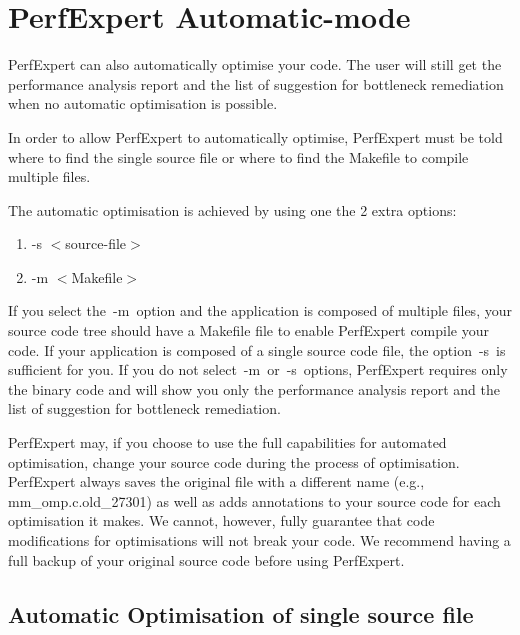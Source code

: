 \section{PerfExpert Automatic-mode}
\label{sec:PerfExpert_Automatic_Mode}


PerfExpert can also automatically optimise your code. The user will still get the performance analysis report and the list of suggestion for bottleneck remediation when no automatic optimisation is possible.

In order to allow PerfExpert to automatically optimise, PerfExpert must be told where to find the single source file or where to find the Makefile to compile multiple files.

The automatic optimisation is achieved by using one the 2 extra options:

\begin{enumerate}
  \item  -s  $<$source-file$>$
  \item  -m  $<$Makefile$>$
\end{enumerate}

If you select the~-m~option and the application is composed of multiple files, your source code tree should have a Makefile file to enable PerfExpert compile your code. If your application is composed of a single source code file, the option~-s~is sufficient for you. If you do not select~-m~or~-s~options, PerfExpert requires only the binary code and will show you only the performance analysis report and the list of suggestion for bottleneck remediation.

 PerfExpert may, if you choose to use the full capabilities for automated optimisation, change your source code during the process of optimisation. PerfExpert always saves the original file with a different name (e.g., mm\_omp.c.old\_27301) as well as adds annotations to your source code for each optimisation it makes. We cannot, however, fully guarantee that code modifications for optimisations will not break your code. We recommend having a full backup of your original source code before using PerfExpert.

\subsection{Automatic Optimisation of single source file}
\label{subsec:Automatic_Optimization}

